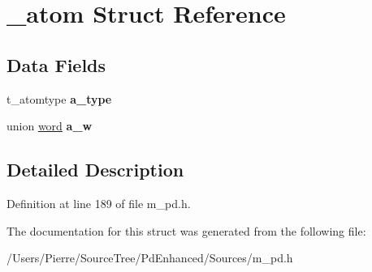 \hypertarget{struct__atom}{\section{\-\_\-atom Struct Reference}
\label{struct__atom}
}
\subsection*{Data Fields}
\begin{DoxyCompactItemize}
\item 
\hypertarget{struct__atom_abfbcbf7ffdb9c9f8b2ef360ea5857210}{t\-\_\-atomtype {\bfseries a\-\_\-type}}\label{struct__atom_abfbcbf7ffdb9c9f8b2ef360ea5857210}

\item 
\hypertarget{struct__atom_a325629e2c919932ac1fe932036071bc7}{union \hyperlink{unionword}{word} {\bfseries a\-\_\-w}}\label{struct__atom_a325629e2c919932ac1fe932036071bc7}

\end{DoxyCompactItemize}


\subsection{Detailed Description}


Definition at line 189 of file m\-\_\-pd.\-h.



The documentation for this struct was generated from the following file\-:\begin{DoxyCompactItemize}
\item 
/\-Users/\-Pierre/\-Source\-Tree/\-Pd\-Enhanced/\-Sources/m\-\_\-pd.\-h\end{DoxyCompactItemize}

